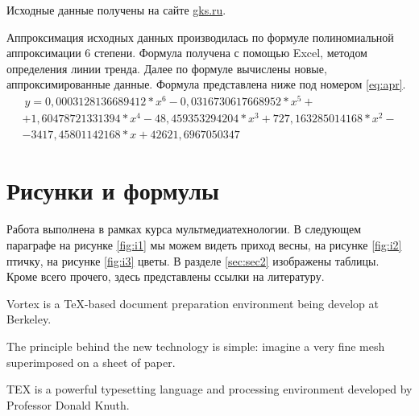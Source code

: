 \documentclass[a4paper,12pt]{article}         %
\begin{document}
Исходные данные получены на сайте \href{https://www.gks.ru/labor_market_employment_salaries}{gks.ru}. 

Аппроксимация исходных данных производилась по формуле полиномиальной аппроксимации 6 степени. Формула получена с помощью Excel, методом определения линии тренда. Далее по формуле вычислены новые, аппроксимированные данные. Формула  представлена ниже под номером \ref{eq:apr}.
\begin{eqnarray}\label{eq:apr}
\ y = 0,0003128136689412*x^6 - 0,0316730617668952*x^5 + \nonumber \\ +1,60478721331394*x^4 - 48,459353294204*x^3 + 727,163285014168*x^2 - \nonumber \\- 3 417,45801142168*x + 42 621,6967050347
\end{eqnarray}
\newpage
\section{Рисунки и формулы}
\label{sec:sec1}
Работа выполнена в рамках курса мультмедиатехнологии. В следующем параграфе на рисунке \ref{fig:i1} мы можем видеть приход весны, на рисунке \ref{fig:i2} птичку, на рисунке \ref{fig:i3} цветы. В разделе \ref{sec:sec2} изображены таблицы.
Кроме всего прочего, здесь представлены ссылки на литературу.


Vortex is a TeX-based document preparation environment being develop at Berkeley\cite{desarmenien1986tex}.

The principle behind the new technology is simple: imagine a very fine mesh superimposed on a sheet of paper\cite{levy2012beginner}.

TEX is a powerful typesetting language and processing environment developed by Professor Donald Knuth\cite{vulis1992modern}.





\newpage
\end{document}
